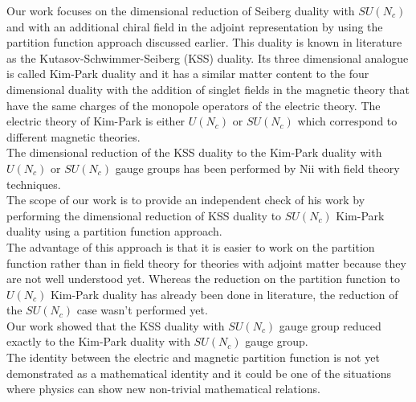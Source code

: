Our work focuses on the dimensional reduction of Seiberg duality with $SU(N_c)$ and with an additional chiral field in the adjoint representation by using the partition function approach discussed earlier.
This duality is known in literature as the Kutasov-Schwimmer-Seiberg (KSS) duality.
Its three dimensional analogue is called Kim-Park duality and it has a similar matter content to the four dimensional duality with the addition of singlet fields in the magnetic theory that have the same charges of the monopole operators of the electric theory.
The electric theory of Kim-Park is either $U(N_c)$ or $SU(N_c)$ which correspond to different magnetic theories. 
 \\
The dimensional reduction of the KSS duality to the Kim-Park duality with $U(N_c)$ or $SU(N_c)$ gauge groups has been performed by Nii with field theory techniques.\\
The scope of our work is to provide an independent check of his work by performing the dimensional reduction of KSS duality to $SU(N_c)$ Kim-Park duality using a partition function approach.\\
The advantage of this approach is that it is easier to work on the partition function rather than in field theory for theories with adjoint matter because they are not well understood yet.
Whereas the reduction on the partition function to $U(N_c)$ Kim-Park duality has already been done in literature, the reduction of the $SU(N_c)$ case wasn't performed yet.\\
Our work showed that the KSS duality with $SU(N_c)$ gauge group reduced exactly to the Kim-Park duality with $SU(N_c)$ gauge group.\\
The identity between the electric and magnetic partition function is not yet demonstrated as a mathematical identity and it could be one of the situations where physics can show new non-trivial mathematical relations. 
\\

